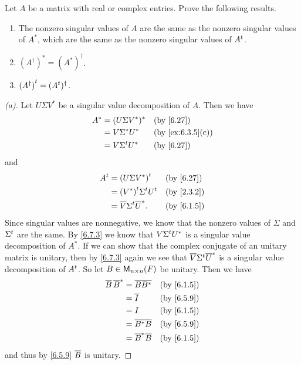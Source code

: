 \begin{ex}\label{ex:6.7.19}
  Let \(A\) be a matrix with real or complex entries.
  Prove the following results.
  \begin{enumerate}
    \item The nonzero singular values of \(A\) are the same as the nonzero singular values of \(A^*\), which are the same as the nonzero singular values of \({A}^{t}\).
    \item \((A^{\dag})^* = (A^*)^{\dag}\).
    \item \({(A^{\dag})}^{t} = ({A}^{t})^{\dag}\).
  \end{enumerate}
\end{ex}

\begin{proof}[(a)]
  Let \(U \Sigma V^*\) be a singular value decomposition of \(A\).
  Then we have
  \begin{align*}
    A^* & = (U \Sigma V^*)^*  &  & \by{6.27}        \\
        & = V \Sigma^* U^*    &  & \by{ex:6.3.5}[c] \\
        & = V \tp{\Sigma} U^* &  & \by{6.27}
  \end{align*}
  and
  \begin{align*}
    \tp{A} & = \tp{(U \Sigma V^*)}              &  & \by{6.27}  \\
           & = \tp{(V^*)} \tp{\Sigma} \tp{U}    &  & \by{2.3.2} \\
           & = \conj{V} \tp{\Sigma} \conj{U}^*. &  & \by{6.1.5}
  \end{align*}
  Since singular values are nonnegative, we know that the nonzero values of \(\Sigma\) and \({\Sigma}^{t}\) are the same.
  By \cref{6.7.3} we know that \(V {\Sigma}^{t} U^*\) is a singular value decomposition of \(A^*\).
  If we can show that the complex conjugate of an unitary matrix is unitary, then by \cref{6.7.3} again we see that \(\overline{V} {\Sigma}^{t} \overline{U}^*\) is a singular value decomposition of \({A}^{t}\).
  So let \(B \in \ms[n][n][\F]\) be unitary.
  Then we have
  \begin{align*}
    \conj{B} \, \conj{B}^* & = \conj{B B^*}        &  & \by{6.1.5} \\
                           & = \conj{I}            &  & \by{6.5.9} \\
                           & = I                   &  & \by{6.1.5} \\
                           & = \conj{B^* B}        &  & \by{6.5.9} \\
                           & = \conj{B}^* \conj{B} &  & \by{6.1.5}
  \end{align*}
  and thus by \cref{6.5.9} \(\overline{B}\) is unitary.
\end{proof}

